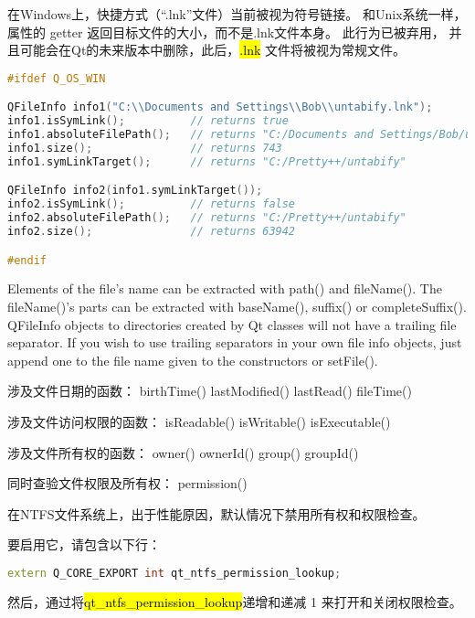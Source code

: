 在Windows上，快捷方式（“.lnk”文件）当前被视为符号链接。 和Unix系统一样，
属性的 getter 返回目标文件的大小，而不是.lnk文件本身。 此行为已被弃用，
并且可能会在Qt的未来版本中删除，此后，\hl{.lnk} 文件将被视为常规文件。

\begin{lstlisting}[language=C++]
#ifdef Q_OS_WIN

QFileInfo info1("C:\\Documents and Settings\\Bob\\untabify.lnk");
info1.isSymLink();          // returns true
info1.absoluteFilePath();   // returns "C:/Documents and Settings/Bob/untabify.lnk"
info1.size();               // returns 743
info1.symLinkTarget();      // returns "C:/Pretty++/untabify"

QFileInfo info2(info1.symLinkTarget());
info2.isSymLink();          // returns false
info2.absoluteFilePath();   // returns "C:/Pretty++/untabify"
info2.size();               // returns 63942

#endif
\end{lstlisting}

Elements of the file's name can be extracted with path() and fileName(). The fileName()'s parts can be extracted with baseName(), suffix() or completeSuffix(). QFileInfo objects to directories created by Qt classes will not have a trailing file separator. If you wish to use trailing separators in your own file info objects, just append one to the file name given to the constructors or setFile().

涉及文件日期的函数： birthTime() lastModified() lastRead() fileTime()

涉及文件访问权限的函数： isReadable() isWritable() isExecutable()

涉及文件所有权的函数： owner() ownerId() group() groupId()

同时查验文件权限及所有权： permission()

\begin{notice}
在NTFS文件系统上，出于性能原因，默认情况下禁用所有权和权限检查。
\end{notice}


要启用它，请包含以下行：

\begin{lstlisting}[language=C++]
extern Q_CORE_EXPORT int qt_ntfs_permission_lookup;
\end{lstlisting}

然后，通过将\hl{qt\_ntfs\_permission\_lookup}递增和递减 1 来打开和关闭权限检查。

